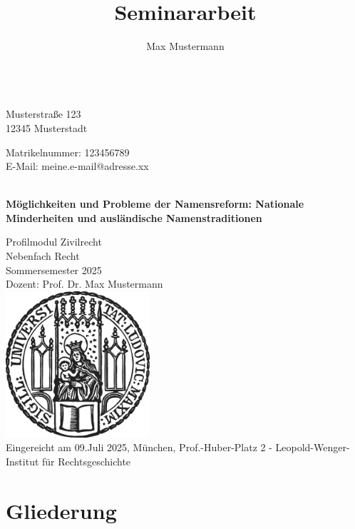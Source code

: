 \documentclass{jura}
\title{Seminararbeit}
\author{Max Mustermann}
\makeatletter
\renewcommand*{\frontmatter}{\cleardoublepage\pagenumbering{Roman}%
	\hsize\frontwidth\columnwidth\hsize\linewidth\hsize\textwidth\hsize}
\newcommand{\Matrikelnummer}[0]{123456789}
\newcommand{\EMail}[0]{meine.e-mail@adresse.xx}
\newcommand{\Adresse}[0]{Musterstraße 123\\ 12345 Musterstadt}
\newcommand{\Fachsemesternummer}[0]{1}
\newcommand{\Vorlesung}[0]{Profilmodul Zivilrecht}
\newcommand{\Semester}[0]{Sommersemester 2025}
\newcommand{\Dozent}[0]{Prof. Dr. Max Mustermann}
\newcommand{\Fachsemester}[0]{{\Fachsemesternummer}. Fachsemester}
\let\thetitle\@title
\let\theauthor\@author
\makeatother
\begin{document}
	
	\frontmatter
	\thispagestyle{empty}
	
	\textbf{\theauthor} \\
	\Adresse \par
	
	Matrikelnummer: \Matrikelnummer \\
	E-Mail: \EMail \par
	
	\vspace{110pt}
	
	\begin{center}
		\textbf{{\fontsize{36}{48} \selectfont \thetitle}}\\
		\vspace{5pt}
		\textbf{Möglichkeiten und Probleme der Namensreform: Nationale Minderheiten und ausländische Namenstraditionen} \par
		\vspace{20pt}
		\large{\Vorlesung\\
			Nebenfach Recht\\
			\Semester\\
			Dozent: \Dozent\\}
		\vspace{10pt}
		\vfill
		\includegraphics[width = 0.4\textwidth]{sigillum.png}
		\normalsize
		\\
		\vspace{0.5cm}
		Eingereicht am 09.Juli 2025, München, Prof.-Huber-Platz 2 - Leopold-Wenger-Institut für Rechtsgeschichte
	\end{center}
	
	\newpage
	
	\onehalfspacing
	
	\section*{Gliederung}
	
\end{document}
